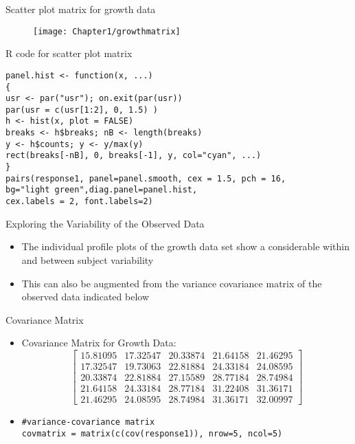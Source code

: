 \documentclass{beamer}
\begin{document}
\begin{frame}{Scatter plot matrix for growth data}
	\begin{figure}[h!]
		\centering
		\texttt{[image: Chapter1/growthmatrix]}
	\end{figure}
\end{frame}

\begin{frame}[fragile]{R code for scatter plot matrix}
	\begin{verbatim}
panel.hist <- function(x, ...)
{
usr <- par("usr"); on.exit(par(usr))
par(usr = c(usr[1:2], 0, 1.5) )
h <- hist(x, plot = FALSE)
breaks <- h$breaks; nB <- length(breaks)
y <- h$counts; y <- y/max(y)
rect(breaks[-nB], 0, breaks[-1], y, col="cyan", ...)
}
pairs(response1, panel=panel.smooth, cex = 1.5, pch = 16,
bg="light green",diag.panel=panel.hist,
cex.labels = 2, font.labels=2)
\end{verbatim}
\end{frame}

\begin{frame}{Exploring the Variability of the Observed Data}
\begin{itemize}
\item The individual profile plots of the growth data set show a considerable within and between subject variability
\item This can also be augmented from the variance covariance matrix of the observed data indicated below
\end{itemize}
\end{frame}

\begin{frame}[fragile]{Covariance Matrix}
\begin{itemize}
\item Covariance Matrix for Growth Data:
\vspace*{2mm}
\[ \left[ \begin{array}{ccccc}
15.81095 & 17.32547 & 20.33874 & 21.64158 & 21.46295\\
17.32547 & 19.73063 & 22.81884 & 24.33184 & 24.08595\\
20.33874 & 22.81884 & 27.15589 & 28.77184 & 28.74984\\
21.64158 & 24.33184 & 28.77184 & 31.22408 & 31.36171\\
21.46295 & 24.08595 & 28.74984 & 31.36171 & 32.00997
\end{array} \right]\]
\item {\color{red}{R code}}
\begin{verbatim}
#variance-covariance matrix
covmatrix = matrix(c(cov(response1)), nrow=5, ncol=5)
\end{verbatim}
\end{itemize}
\end{frame}
\end{document}
